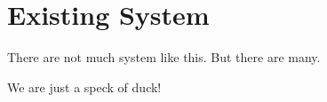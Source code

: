 \section{Existing System}

There are not much system like this. But there are many.

We are just a speck of duck!
